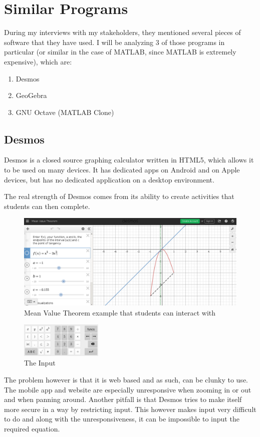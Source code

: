 \documentclass[../../../main.tex]{subfiles}
\begin{document}
\chapter{Similar Programs}
During my interviews with my stakeholders, they mentioned several pieces of software that they have used. I will be analyzing 3 of those programs in particular (or similar in the case of MATLAB, since MATLAB is extremely expensive), which are:
\begin{enumerate}
\item Desmos
\item GeoGebra
\item GNU Octave (MATLAB Clone)
\end{enumerate}

\section{Desmos}
Desmos is a closed source graphing calculator written in HTML5, which allows it to be used on many devices. It has dedicated apps on Android and on Apple devices, but has no dedicated application on a desktop environment.

The real strength of Desmos comes from its ability to create activities that students can then complete.
\begin{figure}[H]
	\includegraphics[width=\textwidth]{images/desmosDemo}
	\caption{Mean Value Theorem example that students can interact with}
\end{figure}
\begin{figure}
	\includegraphics[width=0.35\textwidth]{images/desmosMobile}
	\caption{The Input}
\end{figure}
The problem however is that it is web based and as such, can be clunky to use. The mobile app and website are especially unresponsive when zooming in or out and when panning around. Another pitfall is that Desmos tries to make itself more secure in a way by restricting input. This however makes input very difficult to do and along with the unresponsiveness, it can be impossible to input the required equation.
\end{document}
